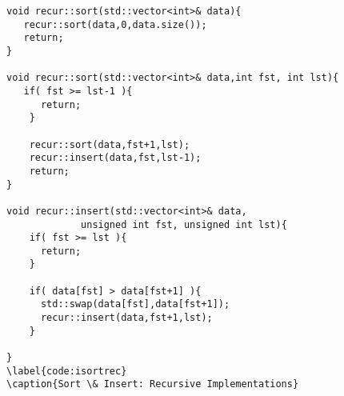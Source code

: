 \documentclass[]{tufte-handout}
\begin{document}
\begin{figure}
\begin{lstlisting}
void recur::sort(std::vector<int>& data){
   recur::sort(data,0,data.size());
   return;
}

void recur::sort(std::vector<int>& data,int fst, int lst){
   if( fst >= lst-1 ){
      return;
    }

    recur::sort(data,fst+1,lst);
    recur::insert(data,fst,lst-1);
    return;
}

void recur::insert(std::vector<int>& data,
		     unsigned int fst, unsigned int lst){
    if( fst >= lst ){
      return;
    }

    if( data[fst] > data[fst+1] ){
      std::swap(data[fst],data[fst+1]);
      recur::insert(data,fst+1,lst);
    }
    
}
\label{code:isortrec}
\caption{Sort \& Insert: Recursive Implementations}
\end{lstlisting}
\end{figure}
\end{document}
